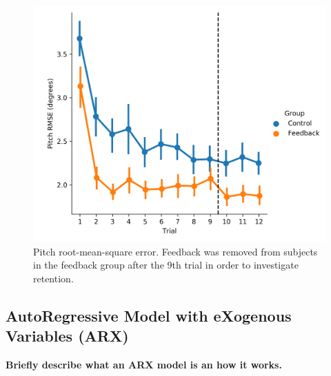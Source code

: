 \begin{figure}[t]
    \centering
    \includegraphics[width=0.8\linewidth]{figures/Modeling/prms_arx.png}
    \caption[Pitch root-mean-square error]{Pitch root-mean-square error. Feedback was removed from subjects in the feedback group after the 9th trial in order to investigate retention.}
    \label{fig:prmse}
\end{figure}

\subsection{AutoRegressive Model with eXogenous Variables (ARX)}
\textbf{\color{red} Briefly describe what an ARX model is an how it works.}



